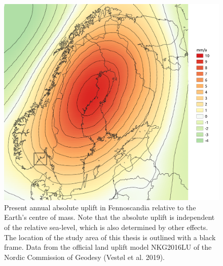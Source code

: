 \documentclass[
  12pt,
  a4paper,
  oneside]{book}
\begin{document}
\begin{figure}

{\centering \includegraphics[width=0.95\linewidth]{figures/present_uplift} 

}

\caption{Present annual absolute uplift in Fennoscandia relative to the Earth's centre of mass. Note that the absolute uplift is independent of the relative sea-level, which is also determined by other effects. The location of the study area of this thesis is outlined with a black frame. Data from the official land uplift model NKG2016LU of the Nordic Commission of Geodesy (Vestøl et al. 2019).}\label{fig:uplift}
\end{figure}
\end{document}
